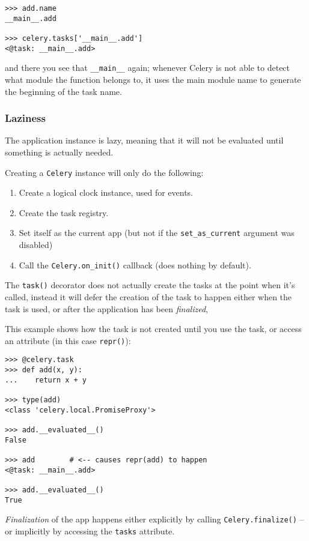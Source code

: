 \documentclass[9pt,a4paper]{article}
\begin{document}
\begin{CJK*}{GBK}{kai}
\begin{Verbatim}[frame=single]
>>> add.name
__main__.add

>>> celery.tasks['__main__.add']
<@task: __main__.add>
\end{Verbatim}

and there you see that \verb"__main__" again; whenever Celery is not able to detect what module the function belongs to, it uses the main module name to generate the beginning of the task name.

\subsubsection{Laziness}
The application instance is lazy, meaning that it will not be evaluated until something is actually needed.

Creating a \verb"Celery" instance will only do the following:

\begin{enumerate}
\item Create a logical clock instance, used for events.
\item Create the task registry.
\item Set itself as the current app (but not if the \verb"set_as_current" argument was disabled)
\item Call the \verb"Celery.on_init()" callback (does nothing by default).
\end{enumerate}

The \verb"task()" decorator does not actually create the tasks at the point when it\textquoteright s called, instead it will defer the creation of the task to happen either when the task is used, or after the application has been \textit{finalized},

This example shows how the task is not created until you use the task, or access an attribute (in this case \verb"repr()"):

\begin{Verbatim}[frame=single]
>>> @celery.task
>>> def add(x, y):
...    return x + y

>>> type(add)
<class 'celery.local.PromiseProxy'>

>>> add.__evaluated__()
False

>>> add        # <-- causes repr(add) to happen
<@task: __main__.add>

>>> add.__evaluated__()
True
\end{Verbatim}

\textit{Finalization} of the app happens either explicitly by calling \verb"Celery.finalize()" – or implicitly by accessing the \verb"tasks" attribute.


\end{CJK*}
\end{document}
